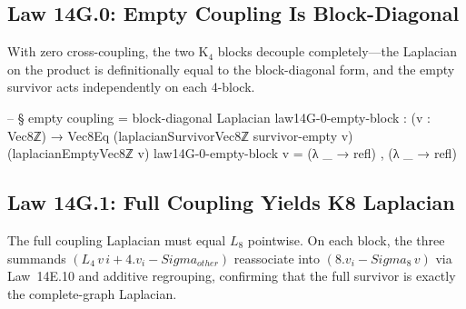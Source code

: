 \documentclass[11pt,a4paper]{book}
\def\Sigma{Sigma}%
\def\cdot{.}%
\def\text#1{#1}%
\def\texorpdfstring#1#2{#2}%
\begin{document}
\subsection{Law 14G.0: Empty Coupling Is Block-Diagonal}

With zero cross-coupling, the two K$_4$ blocks decouple completely---the Laplacian on the product is definitionally equal to the block-diagonal form, and the empty survivor acts independently on each 4-block.

\begin{code}
-- § empty coupling = block-diagonal Laplacian
law14G-0-empty-block : (v : Vec8ℤ) → Vec8Eq (laplacianSurvivorVec8ℤ survivor-empty v) (laplacianEmptyVec8ℤ v)
law14G-0-empty-block v = (λ _ → refl) , (λ _ → refl)
\end{code}

\subsection{Law 14G.1: Full Coupling Yields K\texorpdfstring{$_8$}{8} Laplacian}

The full coupling Laplacian must equal $L_8$ pointwise. On each block, the three summands $(L_4\,v\,i + 4 \cdot v_i - \Sigma_{\text{other}})$ reassociate into $(8 \cdot v_i - \Sigma_8\,v)$ via Law~14E.10 and additive regrouping, confirming that the full survivor is exactly the complete-graph Laplacian.
\end{document}
